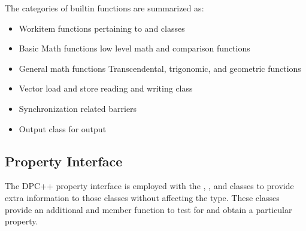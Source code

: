 \documentclass[letterpaper,10pt,english]{sphinxmanual}
\begin{document}
The categories of built\sphinxhyphen{}in functions are summarized as:
\begin{itemize}
\item {} 
Work\sphinxhyphen{}item functions \textendash{} pertaining to  and  classes

\item {} 
Basic Math functions \textendash{} low level math and comparison functions

\item {} 
General math functions \textendash{} Transcendental, trigonomic, and geometric
functions

\item {} 
Vector load and store \textendash{} reading and writing  class

\item {} 
Synchronization \textendash{}  related barriers

\item {} 
Output \textendash{}  class for output

\end{itemize}


\subsection{Property Interface}
\label{\detokenize{programming-interface/property-interface:property-interface}}\label{\detokenize{programming-interface/property-interface:id1}}\label{\detokenize{programming-interface/property-interface::doc}}
The DPC++ property interface is employed with the , ,
and  classes to provide extra information to those classes
without affecting the type. These classes provide an additional
 and  member function to test for and
obtain a particular property.

\begin{fulllineitems}
\label{\detokenize{programming-interface/property-interface:_CPPv4I0E11is_property}}%
\pysigstartmultiline
{}%
\pysigstopmultiline
\end{fulllineitems}
\end{document}
